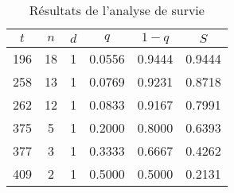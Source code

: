 \documentclass[../main.tex]{subfiles}
\begin{document}
\begin{CJK*}{UTF8}{gbsn}
\begin{table}[h]
  \centering
  \begin{tabular}{|c|c|c|c|c|c|}
  \hline
  $t$ & $n$ & $d$ & $q$ & $1-q$ & $S$ \\ \hline
  196 & 18 & 1 & 0.0556 & 0.9444 & 0.9444 \\ \hline
  258 & 13 & 1 & 0.0769 & 0.9231 & 0.8718 \\ \hline
  262 & 12 & 1 & 0.0833 & 0.9167 & 0.7991 \\ \hline
  375 & 5 & 1 & 0.2000 & 0.8000 & 0.6393 \\ \hline
  377 & 3 & 1 & 0.3333 & 0.6667 & 0.4262 \\ \hline
  409 & 2 & 1 & 0.5000 & 0.5000 & 0.2131 \\ \hline
  \end{tabular}
  \caption{Résultats de l'analyse de survie}
  \label{table:surv_analysis}
\end{table}

\end{CJK*}
\end{document}
